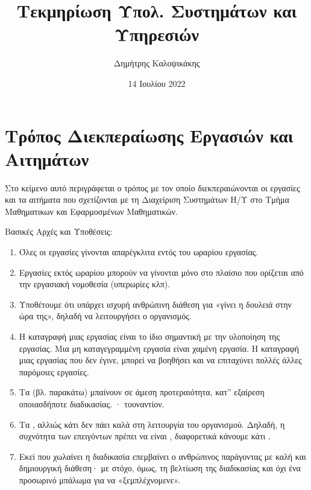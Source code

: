 \documentclass[letterpaper,10pt,greek]{sphinxhowto}
\title{Τεκμηρίωση Υπολ. Συστημάτων και Υπηρεσιών}
\date{14 Ιουλίου 2022}
\author{Δημήτρης Καλοψικάκης}
\begin{document}
\pagestyle{empty}
\sphinxmaketitle
\pagestyle{plain}
\sphinxtableofcontents
\pagestyle{normal}
\label{\detokenize{index::doc}}


\sphinxstepscope


\section{Τρόπος Διεκπεραίωσης Εργασιών και Αιτημάτων}
\label{\detokenize{PolicyTicket:id1}}\label{\detokenize{PolicyTicket::doc}}
\sphinxAtStartPar
Στο κείμενο αυτό περιγράφεται ο τρόπος με τον οποίο
διεκπεραιώνονται οι εργασίες και τα αιτήματα που σχετίζονται
με τη Διαχείριση Συστημάτων Η/Υ στο Τμήμα Μαθηματικων και Εφαρμοσμένων Μαθηματικών.

\sphinxAtStartPar
Βασικές Αρχές και Υποθέσεις:
\begin{enumerate}
%
\item {} 
\sphinxAtStartPar
Όλες οι εργασίες γίνονται απαρέγκλιτα εντός του ωραρίου εργασίας.

\item {} 
\sphinxAtStartPar
Εργασίες εκτός ωραρίου μπορούν να γίνονται μόνο στο πλαίσιο που ορίζεται από την εργασιακή νομοθεσία (υπερωρίες κλπ).

\item {} 
\sphinxAtStartPar
Υποθέτουμε ότι υπάρχει ισχυρή ανθρώπινη διάθεση για «γίνει η δουλειά στην ώρα της», δηλαδή να λειτουργήσει ο οργανισμός.

\item {} 
\sphinxAtStartPar
Η καταγραφή μιας εργασίας είναι  το ίδιο σημαντική με την υλοποίηση της εργασίας. Μια μη καταγεγραμμένη εργασία είναι χαμένη εργασία. Η καταγραφή μιας εργασίας που δεν έγινε, μπορεί να βοηθήσει και να επιταχύνει πολλές άλλες παρόμοιες εργασίες.

\item {} 
\sphinxAtStartPar
Τα  (βλ. παρακάτω) μπαίνουν σε άμεση προτεραιότητα, κατ” εξαίρεση οποιασδήποτε διαδικασίας. · τουναντίον.

\item {} 
\sphinxAtStartPar
Τα , αλλιώς κάτι δεν πάει καλά στη λειτουργία του οργανισμού. Δηλαδή, η συχνότητα των επειγόντων πρέπει να είναι , διαφορετικά κάνουμε κάτι .

\item {} 
\sphinxAtStartPar
Εκεί που χωλαίνει η διαδικασία επεμβαίνει ο ανθρώπινος παράγοντας με καλή και δημιουργική διάθεση· με στόχο, όμως, τη βελτίωση της διαδικασίας και όχι ένα προσωρινό μπάλωμα για να «ξεμπλέχνομενε».

\end{enumerate}
\end{document}
